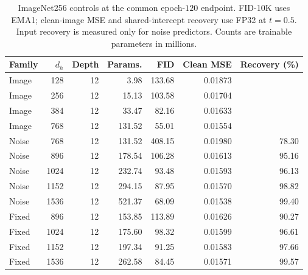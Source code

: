 \begin{table}[H]
\centering
\caption{ImageNet256 controls at the common epoch-$120$ endpoint. FID-10K uses EMA1; clean-image MSE and shared-intercept recovery use FP32 at $t=0.5$. Input recovery is measured only for noise predictors. Counts are trainable parameters in millions.}
\label{tab:width-controls-120}
\small
\begin{tabular}{lrrrrrr}
\toprule
Family & $d_h$ & Depth & Params. & FID & Clean MSE & Recovery (\%)\\
\midrule
Image & 128 & 12 & 3.98 & 133.68 & 0.01873 & \\
Image & 256 & 12 & 15.13 & 103.58 & 0.01704 & \\
Image & 384 & 12 & 33.47 & 82.16 & 0.01633 & \\
Image & 768 & 12 & 131.52 & 55.01 & 0.01554 & \\
Noise & 768 & 12 & 131.52 & 408.15 & 0.01980 & 78.30\\
Noise & 896 & 12 & 178.54 & 106.28 & 0.01613 & 95.16\\
Noise & 1024 & 12 & 232.74 & 93.48 & 0.01593 & 96.13\\
Noise & 1152 & 12 & 294.15 & 87.95 & 0.01570 & 98.82\\
Noise & 1536 & 12 & 521.37 & 68.09 & 0.01538 & 99.40\\
Fixed & 896 & 12 & 153.85 & 113.89 & 0.01626 & 90.27\\
Fixed & 1024 & 12 & 175.60 & 98.32 & 0.01599 & 96.61\\
Fixed & 1152 & 12 & 197.34 & 91.25 & 0.01583 & 97.66\\
Fixed & 1536 & 12 & 262.58 & 84.45 & 0.01571 & 99.57\\
\bottomrule
\end{tabular}
\end{table}
